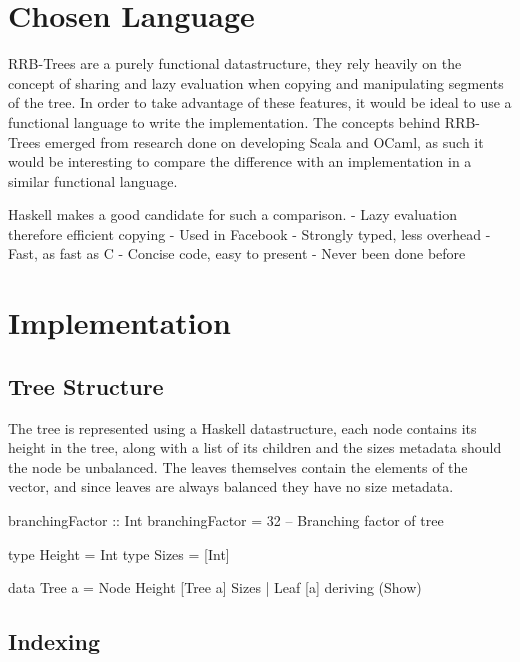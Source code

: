 \documentclass[11pt,a4paper,oneside]{article}
\begin{document}

\section{Chosen Language}

RRB-Trees are a purely functional datastructure, they rely heavily on the concept of sharing and lazy evaluation when copying and manipulating segments of the tree. In order to take advantage of these features, it would be ideal to use a functional language to write the implementation. The concepts behind RRB-Trees emerged from research done on developing Scala and OCaml, as such it would be interesting to compare the difference with an implementation in a similar functional language. 

Haskell makes a good candidate for such a comparison.
- Lazy evaluation therefore efficient copying
- Used in Facebook 
- Strongly typed, less overhead
- Fast, as fast as C
- Concise code, easy to present
- Never been done before 

\section{Implementation}

\subsection*{Tree Structure}

The tree is represented using a Haskell datastructure, each node contains its height in the tree, along with a list of its children and the sizes metadata should the node be unbalanced. The leaves themselves contain the elements of the vector, and since leaves are always balanced they have no size metadata. 

\begin{haskell}

branchingFactor :: Int
branchingFactor = 32 -- Branching factor of tree

type Height = Int
type Sizes = [Int]

data Tree a = Node Height [Tree a] Sizes | Leaf [a]
    deriving (Show)

\end{haskell}

\subsection*{Indexing}
\end{document}
